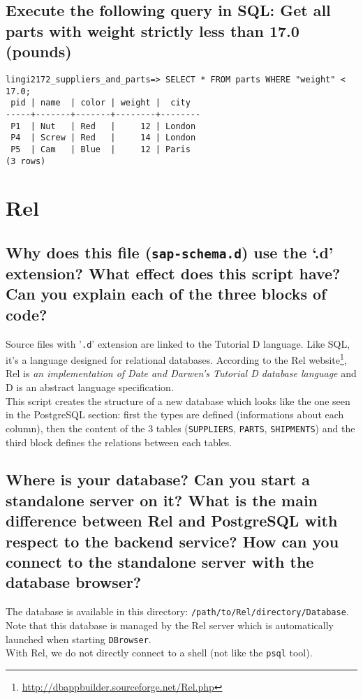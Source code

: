 \documentclass[a4paper,11pt]{article}
\begin{document}

\subsection{Execute the following query in SQL: Get all parts with weight strictly less than 17.0 (pounds)}
\begin{lstlisting}[flexiblecolumns=false]
lingi2172_suppliers_and_parts=> SELECT * FROM parts WHERE "weight" < 17.0;
 pid | name  | color | weight |  city  
-----+-------+-------+--------+--------
 P1  | Nut   | Red   |     12 | London
 P4  | Screw | Red   |     14 | London
 P5  | Cam   | Blue  |     12 | Paris
(3 rows)
\end{lstlisting}





\section{Rel}

\subsection{Why does this file (\texttt{sap-schema.d}) use the ‘.d’ extension? What effect does this script have? Can you explain each of the three blocks of code?}
Source files with '\texttt{.d}' extension are linked to the Tutorial D language. Like SQL, it's a language designed for relational databases. According to the Rel website\footnote{\url{http://dbappbuilder.sourceforge.net/Rel.php}}, Rel is \textit{an implementation of Date and Darwen's Tutorial D database language} and D is an abstract language specification.\\
This script creates the structure of a new database which looks like the one seen in the PostgreSQL section: first the types are defined (informations about each column), then the content of the 3 tables (\texttt{SUPPLIERS}, \texttt{PARTS}, \texttt{SHIPMENTS}) and the third block defines the relations between each tables.


\subsection{Where is your database? Can you start a standalone server on it? What is the main difference between Rel and PostgreSQL with respect to the backend service? How can you connect to the standalone server with the database browser?}
The database is available in this directory: \texttt{/path/to/Rel/directory/Database}. Note that this database is managed by the Rel server which is automatically launched when starting \texttt{DBrowser}.\\
With Rel, we do not directly connect to a shell (not like the \texttt{psql} tool).
\end{document}
